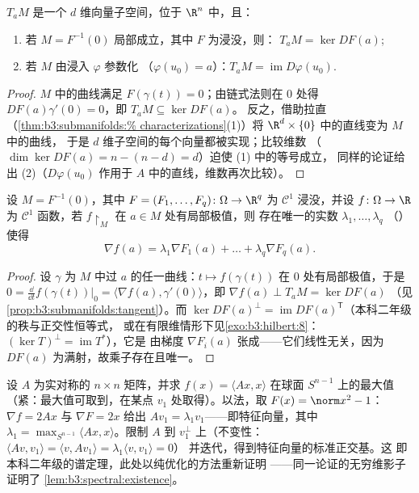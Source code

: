 \begin{proposition}\label{prop:b3:submanifolds:tangent}
$T_aM$ 是一个 $d$ 维向量子空间，位于 $\R^n$ 中，且：
\begin{enumerate}
  \item 若 $M = F^{-1}(0)$ 局部成立，其中 $F$ 为浸没，则：
        $T_aM = \ker DF(a)$;
  \item 若 $M$ 由浸入 $\varphi$ 参数化
        （$\varphi(u_0) = a$）：$T_aM =
        \operatorname{im}D\varphi(u_0)$.
\end{enumerate}
\end{proposition}

\begin{proof}
$M$ 中的曲线满足 $F(\gamma(t)) = 0$；由链式法则在
$0$ 处得 $DF(a)\gamma'(0) = 0$，即 $T_aM \subseteq \ker DF(a)$。
反之，借助拉直（\cref{thm:b3:submanifolds:%
characterizations}(1)）将
$\R^d\times\{0\}$ 中的直线变为 $M$ 中的曲线，
于是 $d$ 维子空间的每个向量都被实现；比较维数
（$\dim\ker DF(a) = n - (n - d) = d$）迫使 (1) 中的等号成立，
同样的论证给出 (2)（$D\varphi(u_0)$
作用于 $A$ 中的直线，维数再次比较）。
\end{proof}

\begin{theorem}[拉格朗日乘子定理]
\label{thm:b3:submanifolds:lagrange}
设 $M = F^{-1}(0)$，其中 $F = (F_1, \dots, F_q) \colon \Omega
\to \R^q$ 为 $\mathcal C^1$ 浸没，并设 $f \colon
\Omega \to \R$ 为 $\mathcal C^1$ 函数，若
$f\restriction_M$ 在 $a \in M$ 处有局部极值，则
存在唯一的实数 $\lambda_1, \dots, \lambda_q$
（\emph{}）使得
\[
\nabla f(a) = \lambda_1\nabla F_1(a) + \dots +
\lambda_q\nabla F_q(a) .
\]
\end{theorem}

\begin{proof}
设 $\gamma$ 为 $M$ 中过 $a$ 的任一曲线：$t \mapsto
f(\gamma(t))$ 在 $0$ 处有局部极值，于是 $0 =
\frac{\dd}{\dd t}f(\gamma(t))\big|_0 = \langle\nabla f(a),
\gamma'(0)\rangle$，即 $\nabla f(a) \perp T_aM = \ker DF(a)$
（见\cref{prop:b3:submanifolds:tangent}）。而 $\ker DF(a)^\perp
= \operatorname{im}DF(a)^{\mathsf T}$（本科二年级的秩与正交性恒等式，
或在有限维情形下见\cref{exo:b3:hilbert:8}：
$(\ker T)^\perp = \operatorname{im}T^*$），它是
由梯度 $\nabla F_i(a)$ 张成——它们线性无关，因为
$DF(a)$ 为满射，故乘子存在且唯一。
\end{proof}

\begin{example}[从几何角度看谱定理]
\label{ex:b3:submanifolds:rayleigh}
设 $A$ 为实对称的 $n\times n$ 矩阵，并求
$f(x) = \langle Ax, x\rangle$ 在球面 $S^{n-1}$ 上的最大值
（紧：最大值可取到，在某点 $v_1$ 处取得）。以法，取 $F(x) = \norm x^2 - 1$：$\nabla f = 2Ax$ 与 $\nabla F =
2x$ 给出 $Av_1 = \lambda_1v_1$——即特征向量，其中
$\lambda_1 = \max_{S^{n-1}}\langle Ax, x\rangle$。限制
$A$ 到 $v_1^\perp$ 上（不变性：$\langle Av, v_1\rangle =
\langle v, Av_1\rangle = \lambda_1\langle v, v_1\rangle = 0$）
并迭代，得到特征向量的标准正交基。这
即本科二年级的谱定理，此处以纯优化的方法重新证明
——同一论证的无穷维影子证明了
\cref{lem:b3:spectral:existence}。
\end{example}

